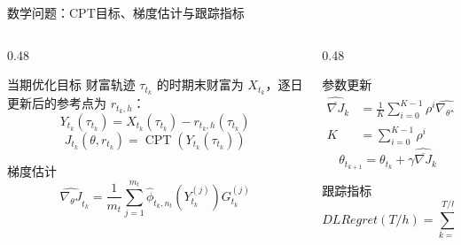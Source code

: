 \documentclass{beamer}
\begin{document}
\begin{frame}{数学问题：CPT目标、梯度估计与跟踪指标}
    \scriptsize
    \setlength{\abovedisplayskip}{2pt}
    \setlength{\belowdisplayskip}{2pt}
    \setlength{\jot}{1pt}
    \begin{columns}[T]
        \begin{column}{0.48\textwidth}
            \begin{block}{当期优化目标}
                财富轨迹 $\tau_{t_k}$ 的时期末财富为 $X_{t_k}$，逐日更新后的参考点为 $r_{t_k,h}$：
                \[
                Y_{t_k}(\tau_{t_k})
                =
                X_{t_k}(\tau_{t_k})-
                r_{t_k,h}(\tau_{t_k})
                \]
                \[
                J_{t_k}(\theta,r_{t_k})
                =
                \operatorname{CPT}
                \left(Y_{t_k}(\tau_{t_k})\right)
                \]
            \end{block}
            \begin{block}{梯度估计}
                \[
                \widehat{\nabla_\theta J}_{t_k}
                =
                \frac{1}{m_t}
                \sum_{j=1}^{m_t}
                \widehat{\phi}_{t_k,n_t}
                \!\left(Y_{t_k}^{(j)}\right)
                G_{t_k}^{(j)}
                \]
            \end{block}
        \end{column}
        \begin{column}{0.48\textwidth}
            \begin{block}{参数更新}
                \[
                \begin{aligned}
                \widehat{\overline{\nabla J}}_k
                &=
                \frac{1}{K}\sum_{i=0}^{K-1}
                \rho^i
                \widehat{\nabla_\theta J}_{t_{k-i}},\\
                K&=\sum_{i=0}^{K-1}\rho^i
                \end{aligned}
                \]
                \[
                \theta_{t_{k+1}}
                =
                \theta_{t_k}
                +\gamma
                \widehat{\overline{\nabla J}}_k
                \]
            \end{block}
            \begin{block}{跟踪指标}
                \[
                DLRegret(T/h)=
                \sum_{k=1}^{T/h}
                \|\widehat{\overline{\nabla J}}_{k}\|^2
                \]
            \end{block}
        \end{column}
    \end{columns}
\end{frame}
\end{document}
